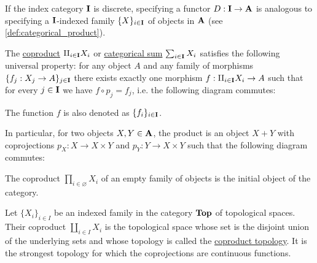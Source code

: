 \begin{definition}\label{def:categorical_sum}\cite[definition 5.2.2]{Leinster2014}
  If the index category $\operatorname{\mathbf{I}}$ is discrete, specifying a functor $D: \operatorname{\mathbf{I}} \to \operatorname{\mathbf{A}}$ is analogous to specifying a $\operatorname{\mathbf{I}}$-indexed family $\{ X \}_{i \in \operatorname{\mathbf{I}}}$ of objects in $\operatorname{\mathbf{A}}$ (see \cref{def:categorical_product}).

  The \uline{coproduct} $\amalg_{i \in \operatorname{\mathbf{I}}} X_i$ or \uline{categorical sum} $\sum_{i \in \operatorname{\mathbf{I}}} X_i$ satisfies the following universal property: for any object $A$ and any family of morphisms $\{ f_j: {X_j} \to A \}_{j \in \operatorname{\mathbf{I}}}$ there exists exactly one morphism $f: \amalg_{i \in \operatorname{\mathbf{I}}} X_i \to A$ such that for every $j \in \operatorname{\mathbf{I}}$ we have $f \circ p_j = f_j$, i.e. the following diagram commutes:
  \begin{center}
  \end{center}

  The function $f$ is also denoted as $\{ f_i \}_{i \in \operatorname{\mathbf{I}}}$.

  In particular, for two objects $X, Y \in \operatorname{\mathbf{A}}$, the product is an object $X + Y$ with coprojections $p_X: X \to X \times Y$ and $p_Y: Y \to X \times Y$ such that the following diagram commutes:
  \begin{center}
  \end{center}
\end{definition}

\begin{note}\label{note:categorical_coproduct_of_empty_family}
  The coproduct $\prod_{i \in \varnothing} X_i$ of an empty family of objects is the initial object of the category.
\end{note}

\begin{example}\label{ex:categorical_coproduct/top}
  Let $\{ X_i \}_{i \in I}$ be an indexed family in the category $\operatorname{\mathbf{Top}}$ of topological spaces. Their coproduct $\amalg_{i \in I} X_i$ is the topological space whose set is the disjoint union of the underlying sets and whose topology is called the \uline{coproduct topology}. It is the strongest topology for which the coprojections are continuous functions.
\end{example}

